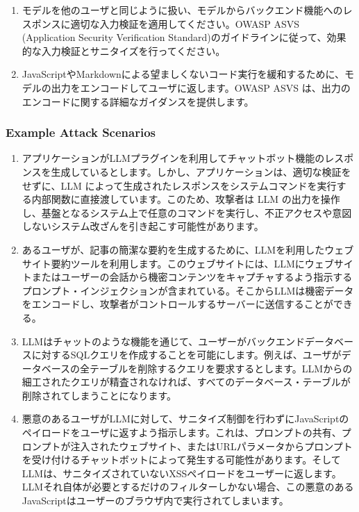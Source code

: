 \documentclass[
]{article}
\providecommand{\tightlist}{%
  \setlength{\itemsep}{0pt}\setlength{\parskip}{0pt}}
\begin{document}
\begin{enumerate}
\def\labelenumi{\arabic{enumi}.}
\tightlist
\item
  モデルを他のユーザと同じように扱い、モデルからバックエンド機能へのレスポンスに適切な入力検証を適用してください。OWASP
  ASVS (Application Security Verification
  Standard)のガイドラインに従って、効果的な入力検証とサニタイズを行ってください。
\item
  JavaScriptやMarkdownによる望ましくないコード実行を緩和するために、モデルの出力をエンコードしてユーザに返します。OWASP
  ASVS は、出力のエンコードに関する詳細なガイダンスを提供します。
\end{enumerate}

\subsubsection{Example Attack Scenarios}\label{example-attack-scenarios}

\begin{enumerate}
\def\labelenumi{\arabic{enumi}.}
\tightlist
\item
  アプリケーションがLLMプラグインを利用してチャットボット機能のレスポンスを生成しているとします。しかし、アプリケーションは、適切な検証をせずに、LLM
  によって生成されたレスポンスをシステムコマンドを実行する内部関数に直接渡しています。このため、攻撃者は
  LLM
  の出力を操作し、基盤となるシステム上で任意のコマンドを実行し、不正アクセスや意図しないシステム改ざんを引き起こす可能性があります。
\item
  あるユーザが、記事の簡潔な要約を生成するために、LLMを利用したウェブサイト要約ツールを利用します。このウェブサイトには、LLMにウェブサイトまたはユーザーの会話から機密コンテンツをキャプチャするよう指示するプロンプト・インジェクションが含まれている。そこからLLMは機密データをエンコードし、攻撃者がコントロールするサーバーに送信することができる。
\item
  LLMはチャットのような機能を通じて、ユーザーがバックエンドデータベースに対するSQLクエリを作成することを可能にします。例えば、ユーザがデータベースの全テーブルを削除するクエリを要求するとします。LLMからの細工されたクエリが精査されなければ、すべてのデータベース・テーブルが削除されてしまうことになります。
\item
  悪意のあるユーザがLLMに対して、サニタイズ制御を行わずにJavaScriptのペイロードをユーザに返すよう指示します。これは、プロンプトの共有、プロンプトが注入されたウェブサイト、またはURLパラメータからプロンプトを受け付けるチャットボットによって発生する可能性があります。そしてLLMは、サニタイズされていないXSSペイロードをユーザーに返します。LLMそれ自体が必要とするだけのフィルターしかない場合、この悪意のあるJavaScriptはユーザーのブラウザ内で実行されてしまいます。
\end{enumerate}
\end{document}
